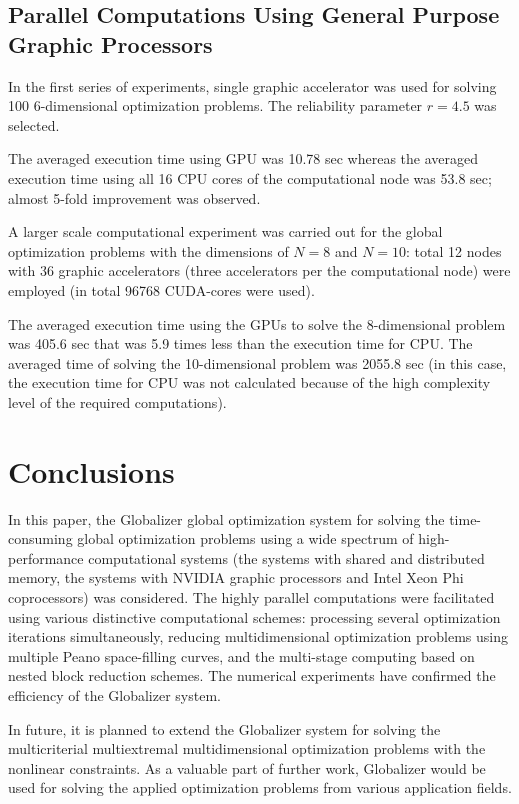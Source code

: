 \documentclass{aims}
\theoremstyle{definition}
\begin{document}
\subsection{Parallel Computations Using General Purpose Graphic Processors}
In the first series of experiments, single graphic accelerator was used for solving 100
6-dimensional optimization problems. The reliability parameter \(r=4.5\) was selected.
\par
The averaged execution time using GPU was 10.78 sec whereas the averaged execution
time using all 16 CPU cores of the computational node was 53.8 sec; almost 5-fold improvement was observed.
\par
A larger scale computational experiment was carried out for the global optimization
problems with the dimensions of \(N = 8\) and \(N = 10\): total 12 nodes with 36 graphic
accelerators (three accelerators per the computational node) were employed (in total 96768 CUDA-cores were used).
\par
The averaged execution time using the GPUs to solve the 8-dimensional problem was
405.6 sec that was 5.9 times less than the execution time for CPU. The averaged time
of solving the 10-dimensional problem was 2055.8 sec (in this case, the execution time for CPU
was not calculated because of the high complexity level of the required computations).

\section{Conclusions} \label{sec:concl}

In this paper, the Globalizer global optimization system for solving the time-consuming global optimization problems using a wide spectrum of high-performance computational systems (the systems with shared and distributed memory, the systems with NVIDIA graphic processors and Intel Xeon Phi coprocessors) was considered. The highly parallel computations were facilitated using various distinctive computational schemes: processing several optimization iterations simultaneously, reducing multidimensional optimization problems using multiple Peano space-filling curves, and the multi-stage computing based on nested block reduction schemes. The numerical experiments have confirmed the efficiency of the Globalizer system.

In future, it is planned to extend the Globalizer system for solving the multicriterial multiextremal multidimensional optimization problems with the nonlinear constraints. As a valuable part of further work, Globalizer would be used for solving the applied optimization problems from various application fields.
%
%
\end{document}
